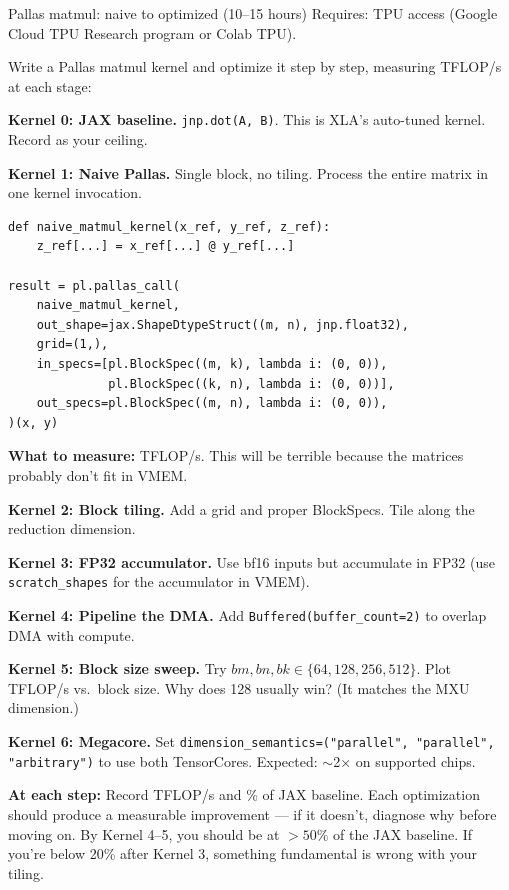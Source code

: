 \begin{exercise}{Pallas matmul: naive to optimized (10--15 hours)}
Requires: TPU access (Google Cloud TPU Research program or Colab TPU).

Write a Pallas matmul kernel and optimize it step by step, measuring TFLOP/s at each stage:

\textbf{Kernel 0: JAX baseline.} \texttt{jnp.dot(A, B)}. This is XLA's auto-tuned kernel. Record as your ceiling.

\textbf{Kernel 1: Naive Pallas.} Single block, no tiling. Process the entire matrix in one kernel invocation.
\begin{lstlisting}
def naive_matmul_kernel(x_ref, y_ref, z_ref):
    z_ref[...] = x_ref[...] @ y_ref[...]

result = pl.pallas_call(
    naive_matmul_kernel,
    out_shape=jax.ShapeDtypeStruct((m, n), jnp.float32),
    grid=(1,),
    in_specs=[pl.BlockSpec((m, k), lambda i: (0, 0)),
              pl.BlockSpec((k, n), lambda i: (0, 0))],
    out_specs=pl.BlockSpec((m, n), lambda i: (0, 0)),
)(x, y)
\end{lstlisting}

\textbf{What to measure:} TFLOP/s. This will be terrible because the matrices probably don't fit in VMEM.

\textbf{Kernel 2: Block tiling.} Add a grid and proper BlockSpecs. Tile along the reduction dimension.

\textbf{Kernel 3: FP32 accumulator.} Use bf16 inputs but accumulate in FP32 (use \texttt{scratch\_shapes} for the accumulator in VMEM).

\textbf{Kernel 4: Pipeline the DMA.} Add \texttt{Buffered(buffer\_count=2)} to overlap DMA with compute.

\textbf{Kernel 5: Block size sweep.} Try $bm, bn, bk \in \{64, 128, 256, 512\}$. Plot TFLOP/s vs.\ block size. Why does 128 usually win? (It matches the MXU dimension.)

\textbf{Kernel 6: Megacore.} Set \texttt{dimension\_semantics=("parallel", "parallel", "arbitrary")} to use both TensorCores. Expected: $\sim$2$\times$ on supported chips.

\textbf{At each step:} Record TFLOP/s and \% of JAX baseline. Each optimization should produce a measurable improvement --- if it doesn't, diagnose why before moving on. By Kernel 4--5, you should be at $>50\%$ of the JAX baseline. If you're below 20\% after Kernel 3, something fundamental is wrong with your tiling.
\end{exercise}

